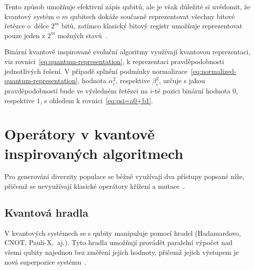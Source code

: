 Tento způsob umožňuje efektivní zápis qubitů, ale je však důležité si uvědomit, že kvantový systém o $m$ qubitech dokáže současně reprezentovat všechny bitové řetězce o~délce $2^m$ bitů, zatímco klasický bitový registr umožňuje reprezentovat pouze jeden z $2^m$ možných stavů~\cite{NaturalComputing}. 

Binární kvantově inspirované evoluční algoritmy využívají kvantovou reprezentaci, viz rovnici~\ref{eq:quantum-representation}, k reprezentaci pravděpodobnosti jednotlivých řešení. 
V případě splnění podmínky normalizace~\ref{eq:normalized-quantum-representation}, hodnota $\alpha^2_i$, respektive $\beta^2_i$, určuje s jakou pravděpodobností bude ve výsledném řetězci na $i$-té pozici binární hodnota $0$, respektive $1$, s ohledem k rovnici~\ref{eq:psi=a0+b1}.

\section{Operátory v kvantově inspirovaných algoritmech}
Pro generování diverzity populace se běžně využívají dva přístupy popsané níže, přičemž se nevyužívají klasické operátory křížení a mutace~\cite{NaturalComputing}.

\subsection{Kvantová hradla}
V kvantových systémech se s qubity manipuluje pomocí hradel (Hadamardovo, CNOT, Pauli-X,~aj.). 
Tyto hradla umožňují provádět paralelní výpočet nad všemi qubity najednou bez změření jejich hodnoty, přičemž jejich výstupem je nová superpozice systému~\cite{NaturalComputing,QuantumComputing-Curious,QuantumComputing-QuantumInformation}. 

